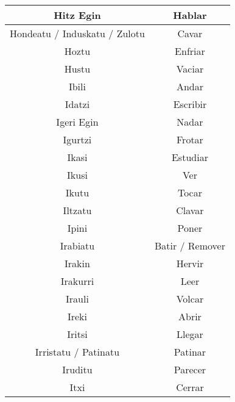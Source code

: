 \documentclass[11pt, a4paper]{article}
\begin{document}
\begin{longtable}{cc}
    \hline
    Hitz Egin                     & Hablar                         \\
    \hline
    Hondeatu / Induskatu / Zulotu & Cavar                          \\
    \hline
    Hoztu                         & Enfriar                        \\
    \hline
    Hustu                         & Vaciar                         \\
    \hline
    Ibili                         & Andar                          \\
    \hline
    Idatzi                        & Escribir                       \\
    \hline
    Igeri Egin                    & Nadar                          \\
    \hline
    Igurtzi                       & Frotar                         \\
    \hline
    Ikasi                         & Estudiar                       \\
    \hline
    Ikusi                         & Ver                            \\
    \hline
    Ikutu                         & Tocar                          \\
    \hline
    Iltzatu                       & Clavar                         \\
    \hline
    Ipini                         & Poner                          \\
    \hline
    Irabiatu                      & Batir / Remover                \\
    \hline
    Irakin                        & Hervir                         \\
    \hline
    Irakurri                      & Leer                           \\
    \hline
    Irauli                        & Volcar                         \\
    \hline
    Ireki                         & Abrir                          \\
    \hline
    Iritsi                        & Llegar                         \\
    \hline
    Irristatu / Patinatu          & Patinar                        \\
    \hline
    Iruditu                       & Parecer                        \\
    \hline
    Itxi                          & Cerrar                         \\

\end{longtable}
\end{document}
